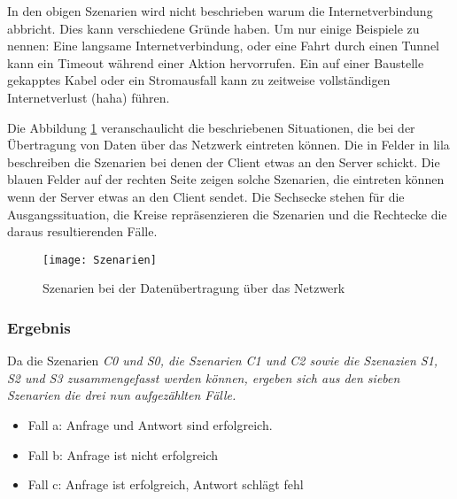 In den obigen Szenarien wird nicht beschrieben warum die Internetverbindung abbricht. Dies kann verschiedene Gründe haben. Um nur einige Beispiele zu nennen: Eine langsame Internetverbindung, oder eine Fahrt durch einen Tunnel kann ein Timeout während einer Aktion hervorrufen. Ein auf einer Baustelle gekapptes Kabel oder ein Stromausfall kann zu zeitweise vollständigen Internetverlust (haha) führen.

Die Abbildung \ref{fig:szenarien} veranschaulicht die beschriebenen Situationen, die bei der Übertragung von Daten über das Netzwerk eintreten können. Die in Felder in lila beschreiben die Szenarien bei denen der Client etwas an den Server schickt. Die blauen Felder auf der rechten Seite zeigen solche Szenarien, die eintreten können wenn der Server etwas an den Client sendet.
Die Sechsecke stehen für die Ausgangssituation, die Kreise repräsenzieren die Szenarien und die Rechtecke die daraus resultierenden Fälle.
\begin{figure}[H]
  \centering
  \texttt{[image: Szenarien]}
  \grayRule
  \caption{Szenarien bei der Datenübertragung über das Netzwerk}
  \label{fig:szenarien}
\end{figure}

%
%
\subsubsection*{Ergebnis}
Da die Szenarien \it{C0} und \it{S0}, die Szenarien \it{C1} und \it{C2} sowie die Szenazien \it{S1}, \it{S2} und \it{S3} zusammengefasst werden können, ergeben sich aus den sieben Szenarien die drei nun aufgezählten Fälle.
\begin{itemize}
  \item Fall a: Anfrage und Antwort sind erfolgreich.
  \item Fall b: Anfrage ist nicht erfolgreich
  \item Fall c: Anfrage ist erfolgreich, Antwort schlägt fehl
\end{itemize}